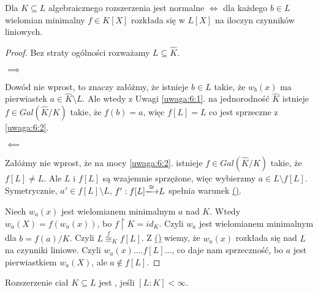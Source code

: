 \begin{theorem}
Dla $K\subseteq L$ algebraicznego rozszerzenia jest normalne $\iff$ dla każdego $b\in L$ wielomian minimalny $f\in K[X]$ rozkłada się w $L[X]$ na iloczyn czynników liniowych.
\end{theorem}
\begin{proof}
Bez straty ogólności rozważamy $L\subseteq\hat{K}$. 

$\implies$ 

Dowód nie wprost, to znaczy załóżmy, że istnieje $b\in L$ takie, że $w_b(x)$ ma pierwiastek $a\in \hat{K}\setminus L$. Ale wtedy z Uwagi \ref{uwaga:6:1}. na jednorodność $\hat{K}$ istnieje $f\in Gal(\hat{K}/K)$ takie, że $f(b)=a$, więc $f[L]=L$ co jest sprzeczne z \ref{uwaga:6:2}.

$\impliedby$

Załóżmy nie wprost, że na mocy \ref{uwaga:6:2}. istnieje $f\in Gal(\hat{K}/K)$ takie, że $f[L]\neq L$. Ale $L$ i $f[L]$ są wzajemnie sprzężone, więc wybierzmy $a\in L\setminus f[L]$. Symetrycznie, $a'\in f[L]\setminus L$, $f':f[L]\isomorphism L$ spełnia warunek \hyperref[aaaa]{{\color{yellow}(\Coffeecup)}}.

Niech $w_a(x)$ jest wielomianem minimalnym $a$ nad $K$. Wtedy $w_a(X)=f(w_a(x))$, bo $f\restriction K=id_K$. Czyli $w_a$ jest wielomianem minimalnym dla $b=f(a)/K$. Czyli $L\overset{f}{\cong}_Kf[L]$. Z \hyperref[aaaa]{{\color{yellow}(\Coffeecup)}} wiemy, że $w_a(x)$ rozkłada się nad $L$ na czynniki liniowe. Czyli $w_a(x)....f[L]...$, co daje nam sprzeczność, bo $a$ jest pierwiastkiem $w_a(X)$, ale $a\notin f[L]$.
\end{proof}

Rozszerzenie ciał $K\subseteq L$ jest , jeśli $[L:K]<\infty$.

